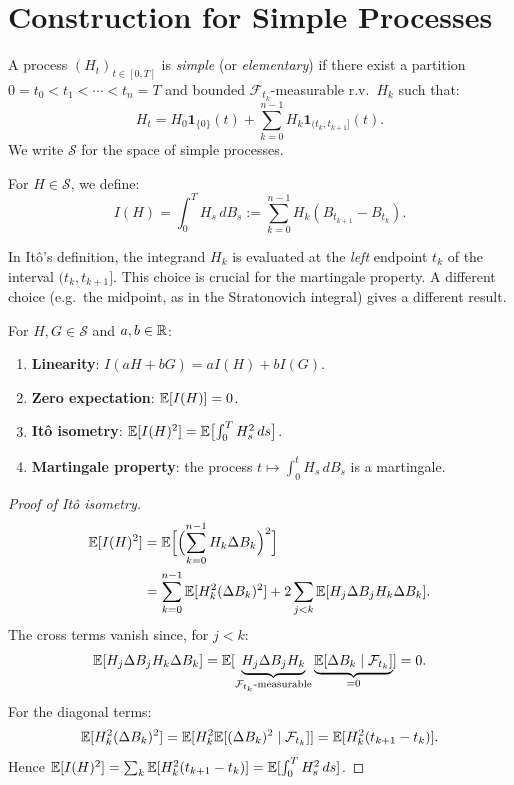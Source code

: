 \section{Construction for Simple Processes}

\begin{definition}
A process $(H_t)_{t \in [0,T]}$ is \emph{simple} (or \emph{elementary}) if there
exist a partition $0 = t_0 < t_1 < \cdots < t_n = T$ and bounded
$\mathcal{F}_{t_k}$-measurable r.v.\ $H_k$ such that:
\[
  H_t = H_0 \mathbf{1}_{\{0\}}(t) + \sum_{k=0}^{n-1} H_k \mathbf{1}_{(t_k, t_{k+1}]}(t).
\]
We write $\mathcal{S}$ for the space of simple processes.
\end{definition}

\begin{definition}
For $H \in \mathcal{S}$, we define:
\[
  I(H) = \int_0^T H_s \, dB_s := \sum_{k=0}^{n-1} H_k (B_{t_{k+1}} - B_{t_k}).
\]
\end{definition}

\begin{warning}[title=\textbf{Left-Point Evaluation}]
In It\^o's definition, the integrand $H_k$ is evaluated at the \emph{left}
endpoint $t_k$ of the interval $(t_k, t_{k+1}]$. This choice is crucial for
the martingale property. A different choice (e.g.\ the midpoint, as in the
Stratonovich integral) gives a different result.
\end{warning}

\begin{proposition}
\label{prop:simple_props}
For $H, G \in \mathcal{S}$ and $a, b \in \mathbb{R}$:
\begin{enumerate}
  \item \textbf{Linearity}: $I(aH + bG) = aI(H) + bI(G)$.
  \item \textbf{Zero expectation}: $\mathbb{E}[I(H)] = 0$.
  \item \textbf{It\^o isometry}:
    $\mathbb{E}[I(H)^2] = \mathbb{E}\bigl[\int_0^T H_s^2 \, ds\bigr]$.
  \item \textbf{Martingale property}: the process
    $t \mapsto \int_0^t H_s \, dB_s$ is a martingale.
\end{enumerate}
\end{proposition}

\begin{proof}[Proof of It\^o isometry]
\begin{align*}
  \mathbb{E}[I(H)^2] &= \mathbb{E}\Bigl[\Bigl(\sum_{k=0}^{n-1} H_k \Delta B_k\Bigr)^2\Bigr] \\
  &= \sum_{k=0}^{n-1} \mathbb{E}[H_k^2 (\Delta B_k)^2]
    + 2 \sum_{j < k} \mathbb{E}[H_j \Delta B_j H_k \Delta B_k].
\end{align*}
The cross terms vanish since, for $j < k$:
\[
  \mathbb{E}[H_j \Delta B_j H_k \Delta B_k]
  = \mathbb{E}[\underbrace{H_j \Delta B_j H_k}_{\mathcal{F}_{t_k}\text{-measurable}}
  \underbrace{\mathbb{E}[\Delta B_k \mid \mathcal{F}_{t_k}]}_{=0}] = 0.
\]
For the diagonal terms:
\[
  \mathbb{E}[H_k^2 (\Delta B_k)^2] = \mathbb{E}[H_k^2 \mathbb{E}[(\Delta B_k)^2 \mid \mathcal{F}_{t_k}]]
  = \mathbb{E}[H_k^2 (t_{k+1} - t_k)].
\]
Hence $\mathbb{E}[I(H)^2] = \sum_k \mathbb{E}[H_k^2 (t_{k+1} - t_k)] = \mathbb{E}[\int_0^T H_s^2 \, ds]$.
\end{proof}

